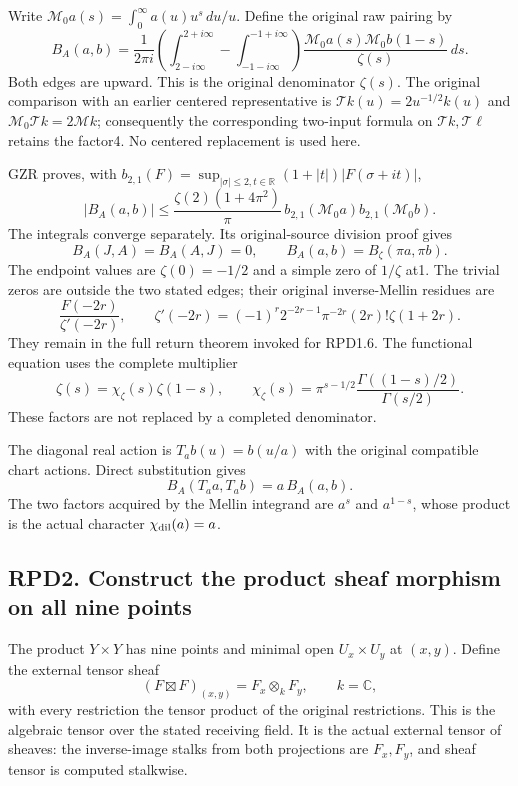 Write \(\mathcal M_0a(s)=\int_0^\infty a(u)u^s\,du/u\). Define the
original raw pairing by \[
B_A(a,b)=\frac1{2\pi i}
\left(\int_{2-i\infty}^{2+i\infty}
-\int_{-1-i\infty}^{-1+i\infty}\right)
\frac{\mathcal M_0a(s)\mathcal M_0b(1-s)}{\zeta(s)}\,ds.
\tag{RPD1.4}
\] Both edges are upward. This is the original denominator \(\zeta(s)\).
The original comparison with an earlier centered representative is
\(\mathcal T k(u)=2u^{-1/2}k(u)\) and
\(\mathcal M_0\mathcal T k=2\mathcal M k\); consequently the
corresponding two-input formula on \(\mathcal T k,\mathcal T\ell\)
retains the factor4. No centered replacement is used here.

GZR proves, with
\(b_{2,1}(F)=\sup_{|\sigma|\le2,t\in\mathbb R}(1+|t|)|F(\sigma+it)|\),
\[
|B_A(a,b)|\le
\frac{\zeta(2)(1+4\pi^2)}{\pi}\,
b_{2,1}(\mathcal M_0a)b_{2,1}(\mathcal M_0b).
\tag{RPD1.5}
\] The integrals converge separately. Its original-source division proof
gives \[
B_A(J,A)=B_A(A,J)=0,\qquad
B_A(a,b)=B_\zeta(\pi a,\pi b).
\tag{RPD1.6}
\] The endpoint values are \(\zeta(0)=-1/2\) and a simple zero of
\(1/\zeta\) at1. The trivial zeros are outside the two stated edges;
their original inverse-Mellin residues are \[
\frac{F(-2r)}{\zeta'(-2r)},\qquad
\zeta'(-2r)=(-1)^r2^{-2r-1}\pi^{-2r}(2r)!\zeta(1+2r).
\tag{RPD1.7}
\] They remain in the full return theorem invoked for RPD1.6. The
functional equation uses the complete multiplier \[
\zeta(s)=\chi_\zeta(s)\zeta(1-s),\qquad
\chi_\zeta(s)=\pi^{s-1/2}
\frac{\Gamma((1-s)/2)}{\Gamma(s/2)}.
\tag{RPD1.8}
\] These factors are not replaced by a completed denominator.

The diagonal real action is \(T_ab(u)=b(u/a)\) with the original
compatible chart actions. Direct substitution gives \[
B_A(T_aa,T_ab)=a\,B_A(a,b).
\tag{RPD1.9}
\] The two factors acquired by the Mellin integrand are \(a^s\) and
\(a^{1-s}\), whose product is the actual character
\(\chi_{\rm dil}(a)=a\).

\subsection{RPD2. Construct the product sheaf morphism on all nine
points}\label{rpd2.-construct-the-product-sheaf-morphism-on-all-nine-points}

The product \(Y\times Y\) has nine points and minimal open
\(U_x\times U_y\) at \((x,y)\). Define the external tensor sheaf \[
(F\boxtimes F)_{(x,y)}=F_x\otimes_kF_y,\qquad k=\mathbb C,
\tag{RPD2.1}
\] with every restriction the tensor product of the original
restrictions. This is the algebraic tensor over the stated receiving
field. It is the actual external tensor of sheaves: the inverse-image
stalks from both projections are \(F_x,F_y\), and sheaf tensor is
computed stalkwise.

